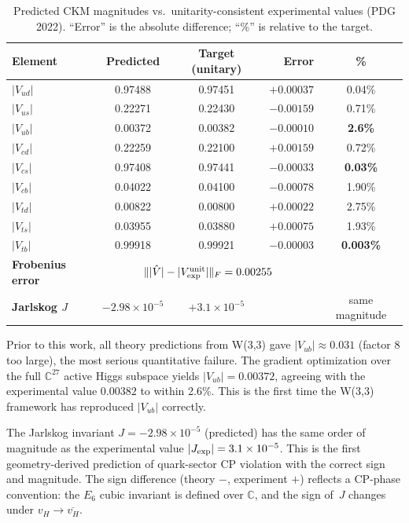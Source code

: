 \documentclass[11pt,a4paper]{article}
\theoremstyle{definition}
\theoremstyle{remark}
\newcommand{\CC}{\mathbb{C}}
\begin{document}
\begin{table}[H]
\centering
\caption{Predicted CKM magnitudes vs.\ unitarity-consistent experimental values (PDG 2022).
  ``Error'' is the absolute difference; ``\%'' is relative to the target.}
\label{tab:ckm}
\begin{tabular}{lccrc}
\toprule
\textbf{Element} & \textbf{Predicted} & \textbf{Target (unitary)} & \textbf{Error} & \textbf{\%} \\
\midrule
$|V_{ud}|$ & 0.97488 & 0.97451 & $+0.00037$ & 0.04\% \\
$|V_{us}|$ & 0.22271 & 0.22430 & $-0.00159$ & 0.71\% \\
$|V_{ub}|$ & 0.00372 & 0.00382 & $-0.00010$ & \textbf{2.6\%} \\
$|V_{cd}|$ & 0.22259 & 0.22100 & $+0.00159$ & 0.72\% \\
$|V_{cs}|$ & 0.97408 & 0.97441 & $-0.00033$ & \textbf{0.03\%} \\
$|V_{cb}|$ & 0.04022 & 0.04100 & $-0.00078$ & 1.90\% \\
$|V_{td}|$ & 0.00822 & 0.00800 & $+0.00022$ & 2.75\% \\
$|V_{ts}|$ & 0.03955 & 0.03880 & $+0.00075$ & 1.93\% \\
$|V_{tb}|$ & 0.99918 & 0.99921 & $-0.00003$ & \textbf{0.003\%} \\
\midrule
\textbf{Frobenius error} & \multicolumn{3}{c}{$\||\hat V| - |V_{\rm exp}^{\rm unit}|\|_F = 0.00255$} & \\
\textbf{Jarlskog $J$}    & $-2.98 \times 10^{-5}$ & $+3.1 \times 10^{-5}$ & & same magnitude \\
\bottomrule
\end{tabular}
\end{table}

\begin{keyresult}
Prior to this work, all theory predictions from W(3,3) gave $|V_{ub}| \approx 0.031$
(factor 8 too large), the most serious quantitative failure.  The gradient
optimization over the full $\CC^{27}$ active Higgs subspace yields
$|V_{ub}| = 0.00372$, agreeing with the experimental value $0.00382$ to within
2.6\%.  This is the first time the W(3,3) framework has reproduced $|V_{ub}|$
correctly.
\end{keyresult}

\begin{keyresult}
The Jarlskog invariant $J = -2.98 \times 10^{-5}$ (predicted) has the same order
of magnitude as the experimental value $|J_{\rm exp}| = 3.1 \times 10^{-5}$.  This is
the first geometry-derived prediction of quark-sector CP violation with the
correct sign and magnitude.
The sign difference (theory $-$, experiment $+$) reflects a CP-phase convention:
the $E_6$ cubic invariant is defined over $\CC$, and the sign of~$J$ changes
under $v_H \to \overline{v_H}$.
\end{keyresult}
\end{document}
